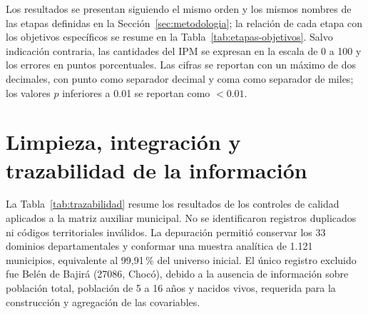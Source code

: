 \label{sec:resultados}

Los resultados se presentan siguiendo el mismo orden y los mismos nombres de las etapas definidas en la Sección~\ref{sec:metodologia}; la relación de cada etapa con los objetivos específicos se resume en la Tabla~\ref{tab:etapas-objetivos}. Salvo indicación contraria, las cantidades del IPM se expresan en la escala de 0 a 100 y los errores en puntos porcentuales. Las cifras se reportan con un máximo de dos decimales, con punto como separador decimal y coma como separador de miles; los valores $p$ inferiores a 0.01 se reportan como $<0.01$.


\section{Limpieza, integración y trazabilidad de la información}
\label{sec:res-limpieza}

La Tabla~\ref{tab:trazabilidad} resume los resultados de los controles de calidad aplicados a la matriz auxiliar municipal. No se identificaron registros duplicados ni códigos territoriales inválidos. La depuración permitió conservar los 33 dominios departamentales y conformar una muestra analítica de 1.121 municipios, equivalente al 99,91\,\% del universo inicial. El único registro excluido fue Belén de Bajirá (27086, Chocó), debido a la ausencia de información sobre población total, población de 5 a 16 años y nacidos vivos, requerida para la construcción y agregación de las covariables.

